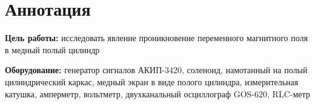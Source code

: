 \section{Аннотация}
\textbf{Цель работы:}
исследовать явление проникновение переменного магнитного поля в медный полый цилиндр

\textbf{Оборудование:}
генератор сигналов АКИП-3420, соленоид, намотанный на полый
цилиндрический каркас, медный экран в виде полого цилиндра, измерительная катушка, амперметр, вольтметр, двухканальный осциллограф
GOS-620, RLC-метр
